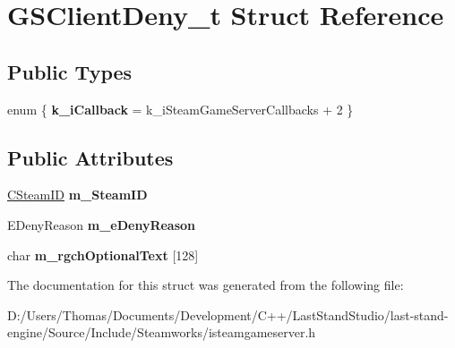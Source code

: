 \hypertarget{structGSClientDeny__t}{}\section{G\+S\+Client\+Deny\+\_\+t Struct Reference}
\label{structGSClientDeny__t}
\subsection*{Public Types}
\begin{DoxyCompactItemize}
\item 
\hypertarget{structGSClientDeny__t_ad3fc407e5f6ddd70e59e31e76ab99949}{}enum \{ {\bfseries k\+\_\+i\+Callback} = k\+\_\+i\+Steam\+Game\+Server\+Callbacks + 2
 \}\label{structGSClientDeny__t_ad3fc407e5f6ddd70e59e31e76ab99949}

\end{DoxyCompactItemize}
\subsection*{Public Attributes}
\begin{DoxyCompactItemize}
\item 
\hypertarget{structGSClientDeny__t_acab5153c26dd8f6745a3dc6ac6d4613f}{}\hyperlink{classCSteamID}{C\+Steam\+I\+D} {\bfseries m\+\_\+\+Steam\+I\+D}\label{structGSClientDeny__t_acab5153c26dd8f6745a3dc6ac6d4613f}

\item 
\hypertarget{structGSClientDeny__t_a1e984d531f47e17081b73a760e4137d5}{}E\+Deny\+Reason {\bfseries m\+\_\+e\+Deny\+Reason}\label{structGSClientDeny__t_a1e984d531f47e17081b73a760e4137d5}

\item 
\hypertarget{structGSClientDeny__t_afeef91fbaff70aee76737e7944a3d920}{}char {\bfseries m\+\_\+rgch\+Optional\+Text} \mbox{[}128\mbox{]}\label{structGSClientDeny__t_afeef91fbaff70aee76737e7944a3d920}

\end{DoxyCompactItemize}


The documentation for this struct was generated from the following file\+:\begin{DoxyCompactItemize}
\item 
D\+:/\+Users/\+Thomas/\+Documents/\+Development/\+C++/\+Last\+Stand\+Studio/last-\/stand-\/engine/\+Source/\+Include/\+Steamworks/isteamgameserver.\+h\end{DoxyCompactItemize}
